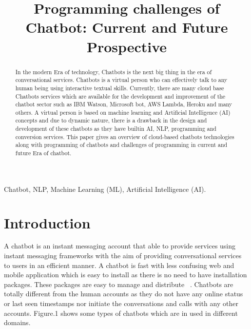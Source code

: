 \documentclass[conference]{IEEEtran}
\begin{document}
\title{Programming challenges of Chatbot: Current and
Future Prospective}

\author{
}

\maketitle

\begin{abstract}
In the modern Era of technology, Chatbots is the
next big thing in the era of conversational services. Chatbots is
a virtual person who can effectively talk to any human being
using interactive textual skills. Currently, there are many cloud
base Chatbots services which are available for the development
and improvement of the chatbot sector such as IBM Watson,
Microsoft bot, AWS Lambda, Heroku and many others. A virtual
person is based on machine learning and Artificial Intelligence
(AI) concepts and due to dynamic nature, there is a drawback in
the design and development of these chatbots as they have builtin AI, NLP, programming and conversion services. This paper
gives an overview of cloud-based chatbots technologies along
with programming of chatbots and challenges of programming
in current and future Era of chatbot.\\
\end{abstract}

\begin{IEEEkeywords}
Chatbot, NLP, Machine Learning (ML), Artificial Intelligence (AI).
\end{IEEEkeywords}

\section{Introduction}
A chatbot is an instant messaging account that able to provide services using instant messaging frameworks with the aim of providing conversational services to users in an efficient manner. A chatbot is fast with less confusing web and mobile application which is easy to install as there is no need to have installation packages. These packages are easy to manage and distribute ~\cite{b1}. Chatbots are totally different from the human accounts as they do not have any online status or last seen timestamps nor initiate the conversations and calls with any other accounts. Figure.1 shows some types of chatbots which are in used in different domains.\\
\end{document}
